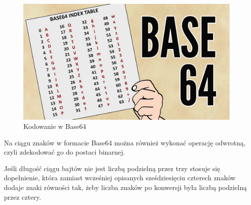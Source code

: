 \begin{figure}[H]
    \centering
    \includegraphics[width=\textwidth]{Images/Base64Coding.jpg}
    \caption{Kodowanie w Base64}
	\label{fig:Base64Coding}
\end{figure}
Na ciągu znaków w formacie Base64 można również wykonać operację odwrotną, czyli zdekodować go do postaci binarnej.

\vspace{0.3\baselineskip}

Jeśli długość ciągu bajtów nie jest liczbą podzielną przez trzy stosuje się dopełnienie, która zamiast wcześniej opisanych sześdziesięciu czterech znaków dodaje znaki równości tak, żeby liczba znaków po konwersji była liczbą podzielną przez cztery.